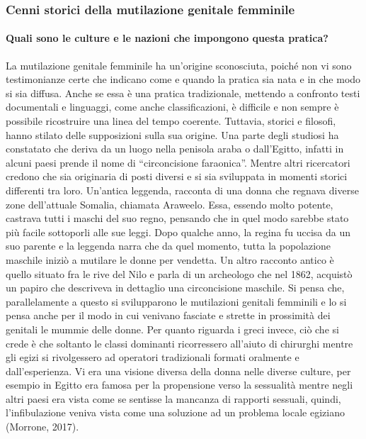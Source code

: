 \subsubsection{Cenni storici della mutilazione genitale femminile}
\paragraph{Quali sono le culture e le nazioni che impongono questa pratica?} 

La mutilazione genitale femminile ha un’origine sconosciuta, poiché non vi sono testimonianze certe che indicano come e quando la pratica sia nata e in che modo si sia diffusa. Anche se essa è una pratica tradizionale, mettendo a confronto testi documentali e linguaggi, come anche classificazioni, è difficile e non sempre è possibile ricostruire una linea del tempo coerente. Tuttavia, storici e filosofi, hanno stilato delle supposizioni sulla sua origine. Una parte degli studiosi ha constatato che deriva da un luogo nella penisola araba o dall’Egitto, infatti in alcuni paesi prende il nome di “circoncisione faraonica”. Mentre altri ricercatori credono che sia originaria di posti diversi e si sia sviluppata in momenti storici differenti tra loro. 
Un’antica leggenda, racconta di una donna che regnava diverse zone dell’attuale Somalia, chiamata Araweelo. Essa, essendo molto potente, castrava tutti i maschi del suo regno, pensando che in quel modo sarebbe stato più facile sottoporli alle sue leggi. Dopo qualche anno, la regina fu uccisa da un suo parente e la leggenda narra che da quel momento, tutta la popolazione maschile iniziò a mutilare le donne per vendetta. 
Un altro racconto antico è quello situato fra le rive del Nilo e parla di un archeologo che nel 1862, acquistò un papiro che descriveva in dettaglio una circoncisione maschile. Si pensa che, parallelamente a questo si svilupparono le mutilazioni genitali femminili e lo si pensa anche per il modo in cui venivano fasciate e strette in prossimità dei genitali le mummie delle donne. Per quanto riguarda i greci invece, ciò che si crede è che soltanto le classi dominanti ricorressero all’aiuto di chirurghi mentre gli egizi si rivolgessero ad operatori tradizionali formati oralmente e dall’esperienza. Vi era una visione diversa della donna nelle diverse culture, per esempio in Egitto era famosa per la propensione verso la sessualità mentre negli altri paesi era vista come se sentisse la mancanza di rapporti sessuali, quindi, l’infibulazione veniva vista come una soluzione ad un problema locale egiziano (Morrone, 2017).
